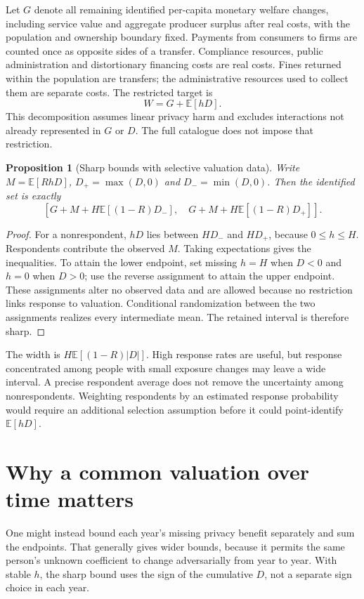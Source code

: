\documentclass[11pt]{article}
\newtheorem{proposition}{Proposition}
\newcommand{\E}{\mathbb E}
\begin{document}
Let $G$ denote all remaining identified per-capita monetary welfare changes, including service value and aggregate producer surplus after real costs, with the population and ownership boundary fixed. Payments from consumers to firms are counted once as opposite sides of a transfer. Compliance resources, public administration and distortionary financing costs are real costs. Fines returned within the population are transfers; the administrative resources used to collect them are separate costs. The restricted target is
\[
 W=G+\E[hD].
\]
This decomposition assumes linear privacy harm and excludes interactions not already represented in $G$ or $D$. The full catalogue does not impose that restriction.

\begin{proposition}[Sharp bounds with selective valuation data]
Write $M=\E[RhD]$, $D_+=\max(D,0)$ and $D_-=\min(D,0)$. Then the identified set is exactly
\[
 \left[G+M+H\E[(1-R)D_-],\quad
       G+M+H\E[(1-R)D_+]\right].
\]
\end{proposition}
\begin{proof}
For a nonrespondent, $hD$ lies between $HD_-$ and $HD_+$, because $0\leq h\leq H$. Respondents contribute the observed $M$. Taking expectations gives the inequalities. To attain the lower endpoint, set missing $h=H$ when $D<0$ and $h=0$ when $D>0$; use the reverse assignment to attain the upper endpoint. These assignments alter no observed data and are allowed because no restriction links response to valuation. Conditional randomization between the two assignments realizes every intermediate mean. The retained interval is therefore sharp.
\end{proof}

The width is $H\E[(1-R)|D|]$. High response rates are useful, but response concentrated among people with small exposure changes may leave a wide interval. A precise respondent average does not remove the uncertainty among nonrespondents. Weighting respondents by an estimated response probability would require an additional selection assumption before it could point-identify $\E[hD]$.

\section*{Why a common valuation over time matters}
One might instead bound each year's missing privacy benefit separately and sum the endpoints. That generally gives wider bounds, because it permits the same person's unknown coefficient to change adversarially from year to year. With stable $h$, the sharp bound uses the sign of the cumulative $D$, not a separate sign choice in each year.
\end{document}
